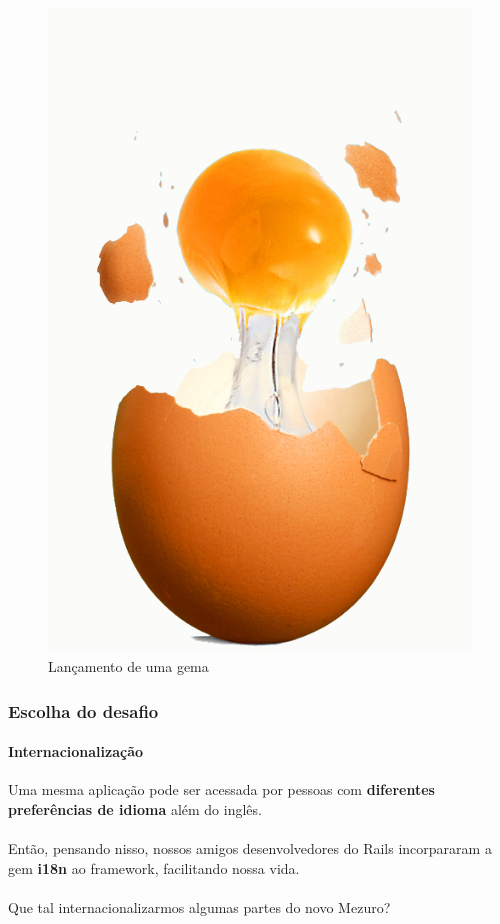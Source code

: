\documentclass{beamer}
\begin{document}
\begin{frame}
\begin{figure}[htb]
\begin{center}
\includegraphics[scale=0.25]{gema.jpg}
\caption{Lançamento de uma gema}
\end{center}
\end{figure}
\end{frame}

\begin{frame}
  \frametitle{Escolha do desafio}
  \framesubtitle{Internacionalização}

  Uma mesma aplicação pode ser acessada por pessoas com \textbf{diferentes preferências de idioma} além do inglês. \\~\\

  Então, pensando nisso, nossos amigos desenvolvedores do Rails incorpararam a gem \textbf{i18n} ao framework, facilitando nossa vida. \\~\\

  Que tal internacionalizarmos algumas partes do novo Mezuro?
\end{frame}
\end{document}
